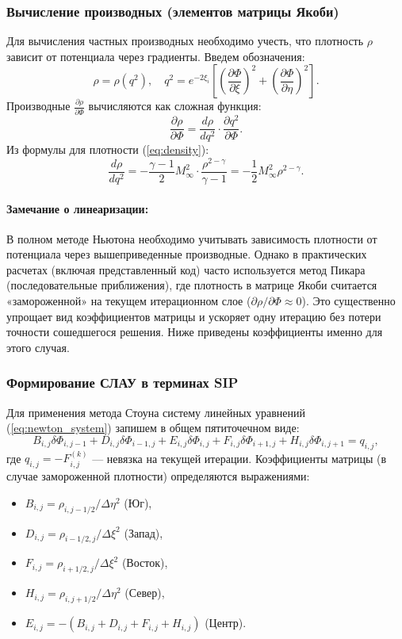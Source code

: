 \documentclass[a4paper,12pt]{article}
\begin{document}
	\subsubsection{Вычисление производных (элементов матрицы Якоби)}
	Для вычисления частных производных необходимо учесть, что плотность $\rho$ зависит от потенциала через градиенты. Введем обозначения:
	\[
	\rho = \rho(q^2), \quad q^2 = e^{-2\xi_i} \left[ \left( \frac{\partial \Phi}{\partial \xi} \right) ^2 + \left( \frac{\partial \Phi}{\partial \eta} \right) ^2 \right].
	\]
	Производные $\frac{\partial \rho}{\partial \Phi}$ вычисляются как сложная функция:
	\[
	\frac{\partial \rho}{\partial \Phi} = \frac{d\rho}{dq^2} \cdot \frac{\partial q^2}{\partial \Phi}.
	\]
	Из формулы для плотности (\ref{eq:density}):
	\[
	\frac{d\rho}{dq^2} = -\frac{\gamma-1}{2} M_\infty^2 \cdot \frac{\rho^{2-\gamma}}{\gamma-1} = -\frac{1}{2} M_\infty^2 \rho^{2-\gamma}.
	\]
	
	\paragraph{Замечание о линеаризации:} В полном методе Ньютона необходимо учитывать зависимость плотности от потенциала через вышеприведенные производные. Однако в практических расчетах (включая представленный код) часто используется метод Пикара (последовательные приближения), где плотность в матрице Якоби считается «замороженной» на текущем итерационном слое ($\partial \rho / \partial \Phi \approx 0$). Это существенно упрощает вид коэффициентов матрицы и ускоряет одну итерацию без потери точности сошедшегося решения. Ниже приведены коэффициенты именно для этого случая.
	
	\subsubsection{Формирование СЛАУ в терминах SIP}
	
	Для применения метода Стоуна систему линейных уравнений (\ref{eq:newton_system}) запишем в общем пятиточечном виде:
	\begin{equation}
		B_{i,j} \delta \Phi_{i,j-1} + D_{i,j} \delta \Phi_{i-1,j} + E_{i,j} \delta \Phi_{i,j} + F_{i,j} \delta \Phi_{i+1,j} + H_{i,j} \delta \Phi_{i,j+1} = q_{i,j},
		\label{eq:sip_stencil}
	\end{equation}
	где $q_{i,j} = -F_{i,j}^{(k)}$ — невязка на текущей итерации. Коэффициенты матрицы (в случае замороженной плотности) определяются выражениями:
	
	\begin{itemize}
		\item $B_{i,j} = \rho_{i,j-1/2} / \Delta \eta^2$ (Юг),
		\item $D_{i,j} = \rho_{i-1/2,j} / \Delta \xi^2$ (Запад),
		\item $F_{i,j} = \rho_{i+1/2,j} / \Delta \xi^2$ (Восток),
		\item $H_{i,j} = \rho_{i,j+1/2} / \Delta \eta^2$ (Север),
		\item $E_{i,j} = -(B_{i,j} + D_{i,j} + F_{i,j} + H_{i,j})$ (Центр).
	\end{itemize}
\end{document}
